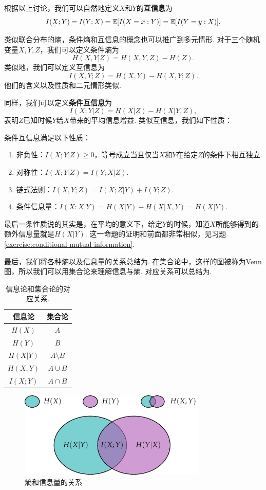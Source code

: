 根据以上讨论，我们可以自然地定义$X$和$Y$的\textbf{互信息}为
\[I(X;Y)=I(Y;X)=\mathbb{E}[I(X=x:Y)]=\mathbb{E}[I(Y=y:X)].\]

类似联合分布的熵，条件熵和互信息的概念也可以推广到多元情形. 对于三个随机变量$X,Y,Z$，我们可以定义条件熵为
\[H(X,Y|Z)=H(X,Y,Z)-H(Z).\]
类似地，我们可以定义互信息为
\[I(X,Y;Z)=H(X,Y)-H(X,Y;Z).\]
他们的含义以及性质和二元情形类似.

同样，我们可以定义\textbf{条件互信息}为
\[I(X;Y|Z)=H(X|Z)-H(X|Y,Z),\]
表明$Z$已知时候$Y$给$X$带来的平均信息增益. 类似互信息，我们如下性质：
\begin{proposition}\label{prop:conditional-mutual-information}
    条件互信息满足以下性质：
    \begin{enumerate}
        \item 非负性：$I(X;Y|Z)\geq 0$，等号成立当且仅当$X$和$Y$在给定$Z$的条件下相互独立.
        \item 对称性：$I(X;Y|Z)=I(Y;X|Z)$.
        \item 链式法则：$I(X,Y;Z)=I(X;Z|Y)+I(Y;Z)$.
        \item 条件信息量：$I(X:X|Y)=H(X|Y)-H(X|X,Y)=H(X|Y)$.
    \end{enumerate}
\end{proposition}
最后一条性质说的其实是，在平均的意义下，给定$Y$的时候，知道$X$所能够得到的额外信息量就是$H(X|Y)$. 这一命题的证明和前面都非常相似，见习题 \ref{exercise:conditional-mutual-information}. 

最后，我们将各种熵以及信息量的关系总结为. 在集合论中，这样的图被称为Venn图，所以我们可以用集合论来理解信息与熵. 对应关系可以总结为.
\begin{table}[ht]
    \centering
        \begin{tabular}{c|c}
        \toprule
        信息论&集合论\\
        \midrule
        $H(X)$&$A$\\
        $H(Y)$&$B$\\
        $H(X|Y)$&$A\setminus B$\\
        $H(X,Y)$&$A\cup B$\\
        $I(X;Y)$&$A\cap B$\\
        \bottomrule
        \end{tabular}
    \caption{信息论和集合论的对应关系.}
    \label{tab:entropy-relation}
\end{table}
\begin{figure}[ht]
    \centering
    \includegraphics[width=0.8\textwidth]{figures/information-theory/entropy-relations.pdf}
    \caption{熵和信息量的关系}
    \label{fig:entropy-relation}
\end{figure}

